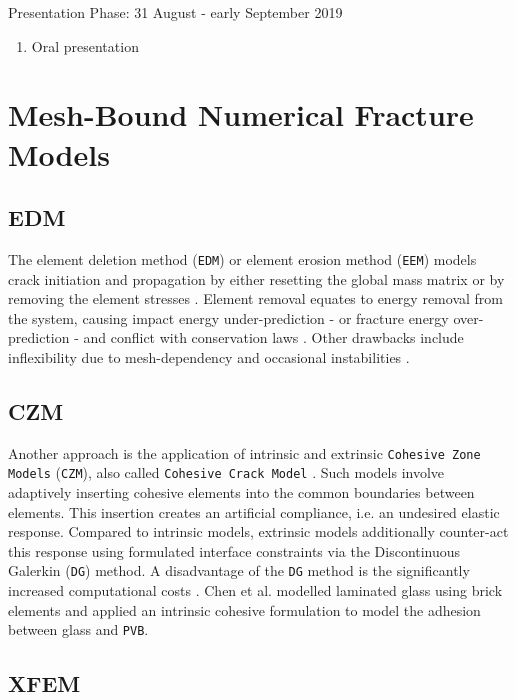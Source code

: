 \documentclass[format=acmtog, 12pt, screen=true, review=false]{acmart}
\begin{document}
Presentation Phase: 31 August - early September 2019
\begin{enumerate}[resume]
    \item Oral presentation 
\end{enumerate}


\setlength{\bibsep}{5.0pt}


\appendix

\section{Mesh-Bound Numerical Fracture Models}

\subsection{EDM}
The element deletion method (\texttt{EDM}) or element erosion method (\texttt{EEM}) models crack initiation and propagation by either resetting the global mass matrix or by removing the element stresses \cite{Wan18, Liu16, Pel16}. Element removal equates to energy removal from the system, causing impact energy under-prediction \cite{Alt17, Ved17} - or fracture energy over-prediction \cite{Pel16} - and conflict with conservation laws \cite{Pel16}. Other drawbacks include inflexibility due to mesh-dependency and occasional instabilities \cite{Pel16}.

\subsection{CZM}

Another approach is the application of intrinsic and extrinsic \texttt{Cohesive Zone Models} (\texttt{CZM}), also called \texttt{Cohesive Crack Model} \cite{Gao14}. Such models involve adaptively inserting cohesive elements into the common boundaries between elements. This insertion creates an artificial compliance, i.e. an undesired elastic response. Compared to intrinsic models, extrinsic models additionally counter-act this response using formulated interface constraints via the Discontinuous Galerkin (\texttt{DG}) method. A disadvantage of the \texttt{DG} method is the significantly increased computational costs \cite{Wan18, Liu16, Che16}. Chen et al. \cite{Che16} modelled laminated glass using brick elements and applied an intrinsic cohesive formulation to model the adhesion between glass and \texttt{PVB}. 

\subsection{XFEM}
\end{document}
